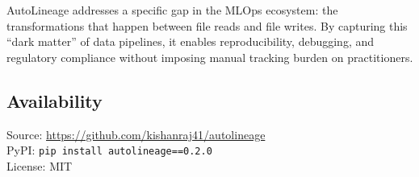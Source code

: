 \documentclass[10pt,twocolumn]{article}
\begin{document}
AutoLineage addresses a specific gap in the MLOps ecosystem: the transformations that happen between file reads and file writes. By capturing this ``dark matter'' of data pipelines, it enables reproducibility, debugging, and regulatory compliance without imposing manual tracking burden on practitioners.

\subsection*{Availability}
Source: \url{https://github.com/kishanraj41/autolineage} \\
PyPI: \texttt{pip install autolineage==0.2.0} \\
License: MIT



\end{document}

